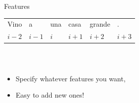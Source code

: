 \documentclass{beamer}
\begin{document}
\begin{frame}{Features}


\begin{center}
\begin{tabular}{llllll}
Vino & a & una & casa & grande & . \\
$i-2$ & $i-1$ & $i$ & $i+1$ & $i+2$ & $i+3$ \\
\end{tabular}
\end{center} 
~\\

\begin{columns}
\begin{column}{0.5\textwidth}

\begin{itemize}
  \item Specify whatever features you want,
  \item Easy to add new ones!
\end{itemize}

\end{column}
\begin{column}{0.5\textwidth}

\end{column}
\end{columns}


\end{frame}
\end{document}
